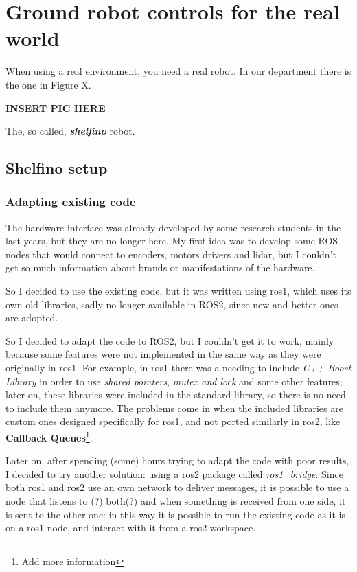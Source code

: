 \chapter{Ground robot controls for the real world}
\label{cha:realworld}

When using a real environment, you need a real robot. In our department there is the one in Figure X.

{\bf INSERT PIC HERE}

The, so called, {\it \textbf {shelfino}} robot.

\section{Shelfino setup}

\subsection{Adapting existing code}

The hardware interface was already developed by some research students in the last years, but they are no longer here. My first idea was to develop some ROS nodes that would connect to encoders, motors drivers and lidar, but I couldn't get so much information about brands or manifestations of the hardware.

So I decided to use the existing code, but it was written using \Acrshort{ros1}, which uses its own old libraries, sadly no longer available in ROS2, since new and better ones are adopted.

So I decided to adapt the code to ROS2, but I couldn't get it to work, mainly because some features were not implemented in the same way as they were originally in \Acrshort{ros1}. For example, in \Acrshort{ros1} there was a needing to include {\it C++ Boost Library} in order to use {\it shared pointers}, {\it mutex and lock} and some other features; later on, these libraries were included in the standard library, so there is no need to include them anymore.
The problems come in when the included libraries are custom ones designed specifically for \Acrshort{ros1}, and not ported similarly in \Acrshort{ros2}, like {\bf Callback Queues}\footnote{Add more information}\cite{migrationguide}.

Later on, after spending (some) hours trying to adapt the code with poor results, I decided to try another solution: using a \Acrshort{ros2} package called {\it ros1\_bridge}. Since both \Acrshort{ros1} and \Acrshort{ros2} use an own network to deliver messages, it is possible to use a node that listens to (?) both(?) and when something is received from one side, it is sent to the other one: in this way it is possible to run the existing code as it is on a \Acrshort{ros1} node, and interact with it from a \Acrshort{ros2} workspace.

